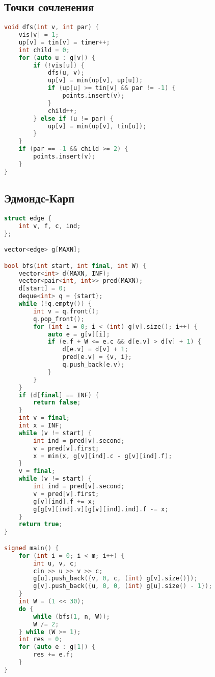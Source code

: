 \documentclass[10pt,a4paper,landscape,twosided]{extarticle}
\begin{document}
\begin{multicols}{3}
\subsection{Точки сочленения}
\begin{lstlisting}[language=C++]
void dfs(int v, int par) {
    vis[v] = 1;
    up[v] = tin[v] = timer++;
    int child = 0;
    for (auto u : g[v]) {
        if (!vis[u]) {
            dfs(u, v);
            up[v] = min(up[v], up[u]);
            if (up[u] >= tin[v] && par != -1) {
                points.insert(v);
            }
            child++;
        } else if (u != par) {
            up[v] = min(up[v], tin[u]);
        }
    }
    if (par == -1 && child >= 2) {
        points.insert(v);
    }
}

\end{lstlisting}

\subsection{Эдмондс-Карп}
\begin{lstlisting}[language=C++]
struct edge {
    int v, f, c, ind;
};

vector<edge> g[MAXN];

bool bfs(int start, int final, int W) {
    vector<int> d(MAXN, INF);
    vector<pair<int, int>> pred(MAXN);
    d[start] = 0;
    deque<int> q = {start};
    while (!q.empty()) {
        int v = q.front();
        q.pop_front();
        for (int i = 0; i < (int) g[v].size(); i++) {
            auto e = g[v][i];
            if (e.f + W <= e.c && d[e.v] > d[v] + 1) {
                d[e.v] = d[v] + 1;
                pred[e.v] = {v, i};
                q.push_back(e.v);
            }
        }
    }
    if (d[final] == INF) {
        return false;
    }
    int v = final;
    int x = INF;
    while (v != start) {
        int ind = pred[v].second;
        v = pred[v].first;
        x = min(x, g[v][ind].c - g[v][ind].f);
    }
    v = final;
    while (v != start) {
        int ind = pred[v].second;
        v = pred[v].first;
        g[v][ind].f += x;
        g[g[v][ind].v][g[v][ind].ind].f -= x;
    }
    return true;
}

signed main() {
    for (int i = 0; i < m; i++) {
        int u, v, c;
        cin >> u >> v >> c;
        g[u].push_back({v, 0, c, (int) g[v].size()});
        g[v].push_back({u, 0, 0, (int) g[u].size() - 1});
    }
    int W = (1 << 30);
    do {
        while (bfs(1, n, W));
        W /= 2;
    } while (W >= 1);
    int res = 0;
    for (auto e : g[1]) {
        res += e.f;
    }
}


\end{lstlisting}
\end{multicols}
\end{document}
